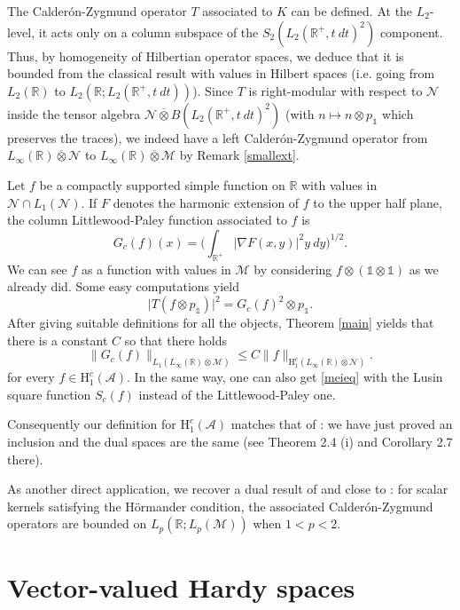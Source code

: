 \documentclass[psamsfonts]{amsart}
\newcommand{\R}{\mathbb{R}}
\newcommand{\Lone}{L_1}
\newcommand{\Linfty}{L_\infty}
\newcommand{\Ltwo}{L_2}
\newcommand{\Honec}{\mathrm{H}_1^c}
\newcommand{\Hardyc}{\Honec(\mathcal{A})}
\begin{document}
The  Calder\'on-Zygmund operator $T$ associated to $K$ can be defined. At
the $\Ltwo$-level, it acts only on a column subspace of the $S_2(\Ltwo(\R^+,t \ dt)^2)$ component. Thus, by homogeneity of Hilbertian operator spaces, we deduce
that it is bounded from the classical result with values in Hilbert spaces (i.e. going from $L_2(\mathbb R)$ to $L_2(\mathbb R; L_2(\mathbb R^+,t \ dt))$). Since $T$ is right-modular with respect to
$\mathcal N$ inside the tensor algebra $\mathcal N\overline \otimes B(\Ltwo(\R^+,t \ dt)^2)$
(with $n\mapsto n\otimes p_{\mathds 1}$ which preserves the traces), we indeed have a left Calder\'on-Zygmund operator from $L_\infty(\mathbb R)\overline \otimes \mathcal N$ to $L_\infty(\mathbb R)\overline \otimes \mathcal M$ by Remark \ref{smallext}.


Let $f$ be a compactly supported simple function on $\R$ with values
in $\mathcal N\cap \Lone(\mathcal N)$. If $F$
denotes the harmonic extension of $f$ to the upper half plane, the
column Littlewood-Paley function associated to $f$ is
$$G_c(f)(x)=\Big(\int_{\R^+} |\nabla F(x,y)|^2 y \ dy\Big)^{1/2}.$$
We can see $f$ as a function
with values in $\mathcal M$ by considering
$f\otimes(\mathds 1\otimes \mathds 1)$ as we already did. Some easy computations yield
$$\big|T (f\otimes p_{ \mathds 1})\big|^2=G_c(f)^2  \otimes p_{ \mathds 1}.$$
After giving suitable definitions for all the objects,  Theorem \ref{main} yields that there is a constant $C$ so that there holds 
\begin{equation}\label{meieq}\|G_c(f)\|_{\Lone(\Linfty(\R)\overline \otimes\mathcal M)}\leq C \|f\|_{\Honec(L_\infty(\mathbb R)\overline \otimes \mathcal N)}.\end{equation}
for every $f\in \Honec(\mathcal{A})$. In the same way, one can also get \eqref{meieq} with the Lusin square function $S_c(f)$ instead of the Littlewood-Paley one.


Consequently our definition for $\Hardyc$  matches that of \cite{M07}: we have just proved an inclusion and the dual spaces are the same (see Theorem 2.4 (i) and Corollary 2.7 there). 

As another direct application, we recover a dual result of \cite{JMP14} and close to \cite{HLMP14}: for scalar
kernels satisfying the H\"ormander condition, the associated
Calder\'on-Zygmund operators are bounded on
$L_p(\mathbb R;L_p(\mathcal M))$ when $1<p<2$.


\appendix
\section{Vector-valued Hardy spaces}\label{app:vectorhardy}
\end{document}
